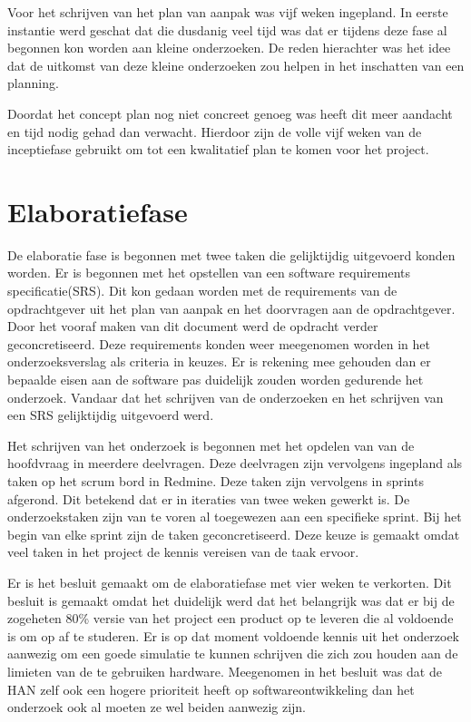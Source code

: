 \documentclass[a4paper, 11pt, oneside]{report}
\begin{document}
Voor het schrijven van het plan van aanpak was vijf weken ingepland. 
In eerste instantie werd geschat dat die dusdanig veel tijd was dat er tijdens deze fase al begonnen kon worden aan kleine onderzoeken.
De reden hierachter was het idee dat de uitkomst van deze kleine onderzoeken zou helpen in het inschatten van een planning.

Doordat het concept plan nog niet concreet genoeg was heeft dit meer aandacht en tijd nodig gehad dan verwacht. 
Hierdoor zijn de volle vijf weken van de inceptiefase gebruikt om tot een kwalitatief plan te komen voor het project.

\section{Elaboratiefase}\label{sec:elaboratiefase}

De elaboratie fase is begonnen met twee taken die gelijktijdig uitgevoerd konden worden.
Er is begonnen met het opstellen van een software requirements specificatie(SRS).
Dit kon gedaan worden met de requirements van de opdrachtgever uit het plan van aanpak en het doorvragen aan de opdrachtgever.
Door het vooraf maken van dit document werd de opdracht verder geconcretiseerd.
Deze requirements konden weer meegenomen worden in het onderzoeksverslag als criteria in keuzes.  
Er is rekening mee gehouden dan er bepaalde eisen aan de software pas duidelijk zouden worden gedurende het onderzoek.
Vandaar dat het schrijven van de onderzoeken en het schrijven van een SRS gelijktijdig uitgevoerd werd. 

Het schrijven van het onderzoek is begonnen met het opdelen van van de hoofdvraag in meerdere deelvragen. 
Deze deelvragen zijn vervolgens ingepland als taken op het scrum bord in Redmine.
Deze taken zijn vervolgens in sprints afgerond. 
Dit betekend dat er in iteraties van twee weken gewerkt is. 
De onderzoekstaken zijn van te voren al toegewezen aan een specifieke sprint.
Bij het begin van elke sprint zijn de taken geconcretiseerd.
Deze keuze is gemaakt omdat  veel taken in het project de kennis vereisen van de taak ervoor.

Er is het besluit gemaakt om de elaboratiefase met vier weken te verkorten. 
Dit besluit is gemaakt omdat het duidelijk werd dat het belangrijk was dat er bij de zogeheten 80\% versie van het project een product op te leveren die al voldoende is om op af te studeren. 
Er is op dat moment voldoende kennis uit het onderzoek aanwezig om een goede simulatie te kunnen schrijven die zich zou houden aan de limieten van de te gebruiken hardware. 
Meegenomen in het besluit was dat de HAN zelf ook een hogere prioriteit heeft op softwareontwikkeling dan het onderzoek ook al moeten ze wel beiden aanwezig zijn.
\end{document}
